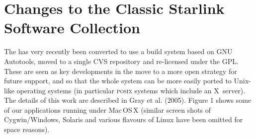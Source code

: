 \documentclass[11pt,twoside]{article}  %
\begin{document}
%
%

\section{Changes to the Classic Starlink Software Collection}

The
has very recently been converted to use a build system based on GNU Autotools,
moved to a single CVS repository and re-licensed under the GPL. 
These are seen as key developments in the move to a more open strategy for
future support, and so that the whole system can be more easily ported to
Unix-like operating systems (in particular
\textsc{posix} systems which include an X~server).
The details of this work are described in Gray et al. (2005).  
Figure 1 shows some of our applications running under Mac\,OS\,X (similar screen
shots of Cygwin/Windows, Solaris and various flavours of Linux have been
omitted for space reasons).
\end{document}
